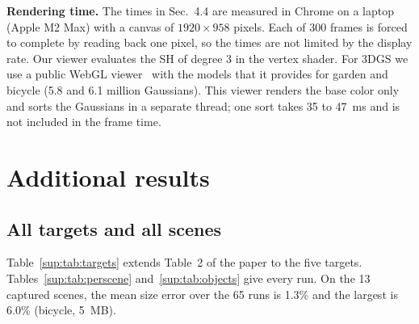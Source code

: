 \noindent\textbf{Rendering time.} The times in Sec.~4.4 are measured in Chrome on a laptop (Apple M2 Max) with a canvas of $1920\times958$ pixels. Each of 300 frames is forced to complete by reading back one pixel, so the times are not limited by the display rate. Our viewer evaluates the SH of degree 3 in the vertex shader. For 3DGS we use a public WebGL viewer~\cite{splatviewer} with the models that it provides for garden and bicycle (5.8 and 6.1 million Gaussians). This viewer renders the base color only and sorts the Gaussians in a separate thread; one sort takes 35 to 47~ms and is not included in the frame time.

\section{Additional results}
\label{sup:results}

\subsection{All targets and all scenes}
Table~\ref{sup:tab:targets} extends Table~2 of the paper to the five targets. Tables~\ref{sup:tab:perscene} and~\ref{sup:tab:objects} give every run. On the 13 captured scenes, the mean size error over the 65 runs is 1.3\% and the largest is 6.0\% (bicycle, 5~MB).

